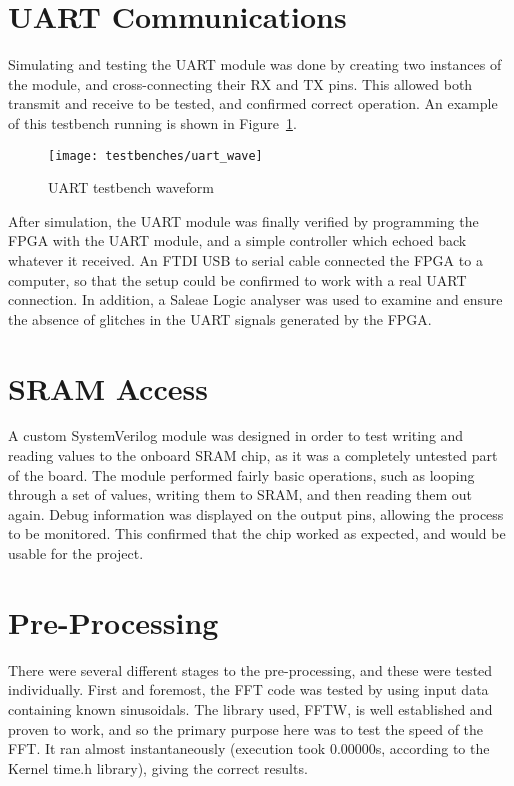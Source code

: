 \section{UART Communications} %
\label{sec:uart_communications_testing}
	Simulating and testing the UART module was done by creating two instances of the module, and cross-connecting their RX and TX pins.  This allowed both transmit and receive to be tested, and confirmed correct operation.  An example of this testbench running is shown in Figure~\ref{fig:test_uart}.  

	\begin{figure}[tb]
		\begin{center}
			\texttt{[image: testbenches/uart\_wave]}
		\end{center}
		\caption{UART testbench waveform}
		\label{fig:test_uart}
	\end{figure}

	After simulation, the UART module was finally verified by programming the FPGA with the UART module, and a simple controller which echoed back whatever it received.  An FTDI USB to serial cable connected the FPGA to a computer, so that the setup could be confirmed to work with a real UART connection.  In addition, a Saleae Logic analyser was used to examine and ensure the absence of glitches in the UART signals generated by the FPGA.


\section{SRAM Access} %
\label{sec:sram_access_testing}
	A custom SystemVerilog module was designed in order to test writing and reading values to the onboard SRAM chip, as it was a completely untested part of the board.  The module performed fairly basic operations, such as looping through a set of values, writing them to SRAM, and then reading them out again.  Debug information was displayed on the output pins, allowing the process to be monitored.  This confirmed that the chip worked as expected, and would be usable for the project.


\section{Pre-Processing} %
\label{sec:pre_processing_testing}
	There were several different stages to the pre-processing, and these were tested individually.  First and foremost, the FFT code was tested by using input data containing known sinusoidals.  The library used, FFTW, is well established and proven to work, and so the primary purpose here was to test the speed of the FFT.  It ran almost instantaneously (execution took 0.00000s, according to the Kernel time.h library), giving the correct results. %

